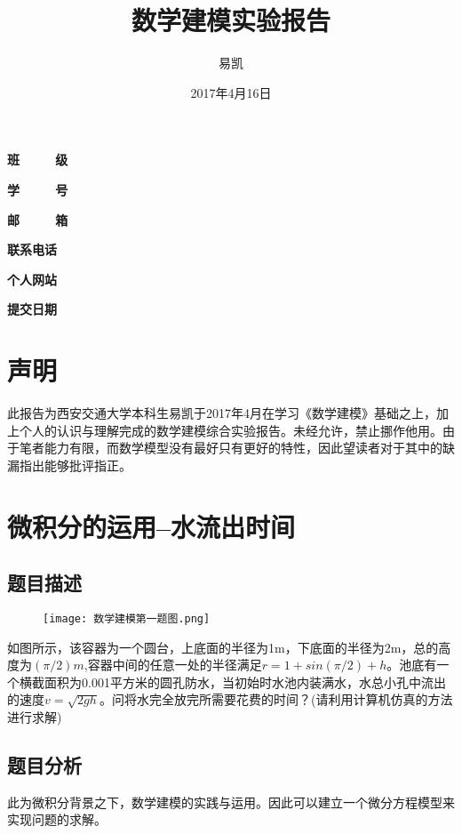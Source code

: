\documentclass[UTF8]{ctexart}
\title{\Huge{数学建模实验报告}}
\author{\Huge{易凯}}
\date{\Huge{2017年4月16日}}
\begin{document}
  \maketitle
  \vspace{35mm}
  \begin{flushright}
  \Large{
    \textbf{班\ \ \ \ \ 级} 

    \textbf{学\ \ \ \ \ 号} 

    \textbf{邮\ \ \ \ \ 箱} 

    \textbf{联系电话} 

    \textbf{个人网站} 

    \textbf{提交日期} 
    }
    \end{flushright}
    \newpage
    \tableofcontents
    \newpage
    \listoffigures
    \newpage
    \listoftables
    \newpage

    \section{声明}
    此报告为西安交通大学本科生易凯于2017年4月在学习《数学建模》基础之上，加上个人的认识与理解完成的数学建模综合实验报告。未经允许，禁止挪作他用。由于笔者能力有限，而数学模型没有最好只有更好的特性，因此望读者对于其中的缺漏指出能够批评指正。

    \section{微积分的运用--水流出时间}
    \subsection{题目描述}

    \begin{figure}[!htb]
	\centering
	\texttt{[image: 数学建模第一题图.png]}
	\end{figure}

    如图所示，该容器为一个圆台，上底面的半径为1m，下底面的半径为2m，总的高度为$(\pi/2)m$,容器中间的任意一处的半径满足$r=1+sin(\pi/2)+h$。池底有一个横截面积为0.001平方米的圆孔防水，当初始时水池内装满水，水总小孔中流出的速度$v=\sqrt{2gh}$。问将水完全放完所需要花费的时间？(请利用计算机仿真的方法进行求解)

    \subsection{题目分析}
    此为微积分背景之下，数学建模的实践与运用。因此可以建立一个微分方程模型来实现问题的求解。
\end{document}
